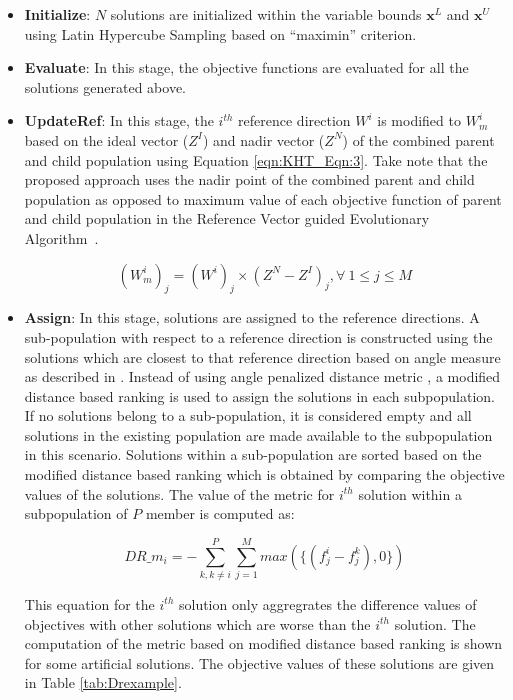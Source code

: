 \documentclass{sig-alternate}
\begin{document}
\begin{itemize}
	\item \textbf{Initialize}: $N$ solutions are initialized within the variable bounds $\textbf{x}^{L}$ and $\textbf{x}^{U}$ using Latin Hypercube Sampling based on ``maximin'' criterion.
	
	\item \textbf{Evaluate}: In this stage, the objective functions are evaluated for all the solutions generated above.
	
	\item \textbf{UpdateRef}: In this stage, the $i^{th}$ reference direction $W^i$ is modified to $W^i_m$ based on the ideal vector ($Z^I$) and nadir vector ($Z^N$) of the combined parent and child population using Equation \ref{eqn:KHT_Eqn:3}. Take note that the proposed approach uses the nadir point of the combined parent and child population as opposed to maximum value of each objective function of parent and child population in the Reference Vector guided Evolutionary Algorithm~\cite{Cheng2016many}. 
	
	\begin{equation}
	(W^i_m)_j = (W^i)_j\times(Z^N - Z^I)_j, \forall~1\le j\le M
	\label{eqn:KHT_Eqn:3}
	\end{equation}
	
	
	\item \textbf{Assign}: In this stage, solutions are assigned to the reference directions. A sub-population with respect to a reference direction is constructed using the solutions which are closest to that reference direction based on angle measure as described in \cite{Cheng2016many}. Instead of using angle penalized distance metric \cite{Cheng2016many}, a modified distance based ranking is used to assign the solutions in each subpopulation. If no solutions belong to a sub-population, it is considered empty and all solutions in the existing population are made available to the subpopulation in this scenario. Solutions within a sub-population are sorted based on the modified distance based ranking which is obtained by comparing the objective values of the solutions. The value of the metric for $i^{th}$ solution within a subpopulation of $P$ member is computed as:
	
	\begin{equation}
	DR\_m_i = -\sum_{k,k\neq i}^P\sum_{j=1}^M max(\{(f^i_j - f^k_j),0\}) 
	\label{eqn:KHT_Eqn:4}
	\end{equation}
	
	This equation for the $i^{th}$ solution only aggregrates the difference values of objectives with other solutions which are worse than the $i^{th}$ solution. The computation of the metric based on modified distance based ranking is shown for some artificial solutions. The objective values of these solutions are given in Table \ref{tab:Drexample}.
	

\end{itemize}
\end{document}
